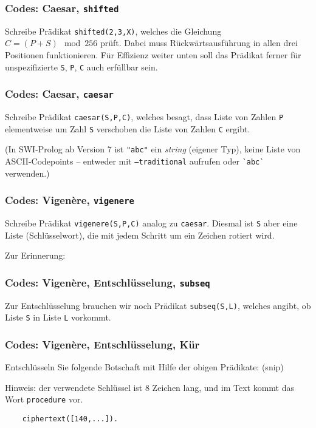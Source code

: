 \documentclass{beamer}
\begin{document}
\begin{frame}
  \frametitle{Codes: Caesar, \lstinline{shifted}}
  Schreibe Prädikat \lstinline{shifted(2,3,X)}, welches die Gleichung $C=(P+S) \mod 256$ prüft.
  Dabei muss Rückwärtsausführung in allen drei Positionen funktionieren.
  Für Effizienz weiter unten soll das Prädikat ferner für unspezifizierte \lstinline{S}, \lstinline{P}, \lstinline{C} auch erfüllbar sein.
  \pause
  
\end{frame}

\begin{frame}[fragile]
  \frametitle{Codes: Caesar, \lstinline{caesar}}
  Schreibe Prädikat \lstinline{caesar(S,P,C)}, welches besagt,
  dass Liste von Zahlen \lstinline{P} elementweise um Zahl \lstinline{S} verschoben die Liste von Zahlen \lstinline{C} ergibt.
  
  (In SWI-Prolog ab Version 7 ist \lstinline{"abc"} ein \emph{string} (eigener Typ), keine Liste von ASCII-Codepoints –
  entweder mit \texttt{--traditional} aufrufen oder \lstinline{`abc`} verwenden.)
  
  \pause
  
\end{frame}

\begin{frame}[fragile]
  \frametitle{Codes: Vigenère, \lstinline{vigenere}}
  Schreibe Prädikat \lstinline{vigenere(S,P,C)} analog zu \lstinline{caesar}.
  Diesmal ist \lstinline{S} aber eine Liste (Schlüsselwort), die mit jedem Schritt um ein Zeichen rotiert wird.
  
  Zur Erinnerung:
  
  
  \pause
  
\end{frame}

\begin{frame}[fragile]
  \frametitle{Codes: Vigenère, Entschlüsselung, \lstinline{subseq}}
  Zur Entschlüsselung brauchen wir noch Prädikat \lstinline{subseq(S,L)}, welches angibt, ob Liste \lstinline{S} in Liste \lstinline{L} vorkommt.
  
  \pause
  
\end{frame}

\begin{frame}[fragile]
  \frametitle{Codes: Vigenère, Entschlüsselung, Kür}
  Entschlüsseln Sie folgende Botschaft mit Hilfe der obigen Prädikate: (snip)
  
  Hinweis: der verwendete Schlüssel ist 8 Zeichen lang, und im Text kommt das Wort \texttt{procedure} vor.
  
  \begin{lstlisting}
    ciphertext([140,...]).
  \end{lstlisting}
  \pause
  
\end{frame}
\end{document}
